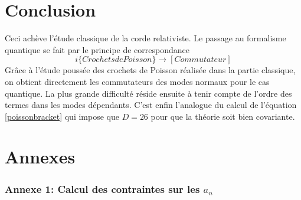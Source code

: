 \documentclass[a4paper,12pt]{article}
\begin{document}
\part*{Conclusion}
Ceci achève l'étude classique de la corde relativiste. Le passage au formalisme quantique se fait par le principe de correspondance
$$i\{Crochets de Poisson\} \rightarrow \left[Commutateur\right]$$
Grâce à l'étude poussée des crochets de Poisson réalisée dans la partie classique, on obtient directement les commutateurs des modes normaux pour le cas quantique. La plus grande difficulté réside ensuite à tenir compte de l'ordre des termes dans les modes dépendants. C'est enfin l'analogue du calcul de l'équation \eqref{poissonbracket} qui impose que $D=26$ pour que la théorie soit bien covariante.
\part*{Annexes}
\section*{Annexe 1: Calcul des contraintes sur les $a_n$}
\end{document}
